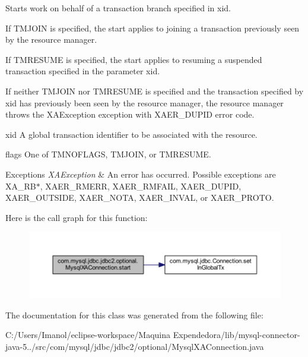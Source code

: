 Starts work on behalf of a transaction branch specified in xid.

If T\+M\+J\+O\+IN is specified, the start applies to joining a transaction previously seen by the resource manager.

If T\+M\+R\+E\+S\+U\+ME is specified, the start applies to resuming a suspended transaction specified in the parameter xid.

If neither T\+M\+J\+O\+IN nor T\+M\+R\+E\+S\+U\+ME is specified and the transaction specified by xid has previously been seen by the resource manager, the resource manager throws the X\+A\+Exception exception with X\+A\+E\+R\+\_\+\+D\+U\+P\+ID error code.

xid A global transaction identifier to be associated with the resource.

flags One of T\+M\+N\+O\+F\+L\+A\+GS, T\+M\+J\+O\+IN, or T\+M\+R\+E\+S\+U\+ME.


\begin{DoxyExceptions}{Exceptions}
{\em X\+A\+Exception} & An error has occurred. Possible exceptions are X\+A\+\_\+\+R\+B$\ast$, X\+A\+E\+R\+\_\+\+R\+M\+E\+RR, X\+A\+E\+R\+\_\+\+R\+M\+F\+A\+IL, X\+A\+E\+R\+\_\+\+D\+U\+P\+ID, X\+A\+E\+R\+\_\+\+O\+U\+T\+S\+I\+DE, X\+A\+E\+R\+\_\+\+N\+O\+TA, X\+A\+E\+R\+\_\+\+I\+N\+V\+AL, or X\+A\+E\+R\+\_\+\+P\+R\+O\+TO. \\
\hline
\end{DoxyExceptions}
Here is the call graph for this function\+:
\nopagebreak
\begin{figure}[H]
\begin{center}
\leavevmode
\includegraphics[width=350pt]{classcom_1_1mysql_1_1jdbc_1_1jdbc2_1_1optional_1_1_mysql_x_a_connection_a7c2af1d5be8d8ba54c6293c6e3e61ffd_cgraph}
\end{center}
\end{figure}


The documentation for this class was generated from the following file\+:\begin{DoxyCompactItemize}
\item 
C\+:/\+Users/\+Imanol/eclipse-\/workspace/\+Maquina Expendedora/lib/mysql-\/connector-\/java-\/5../src/com/mysql/jdbc/jdbc2/optional/Mysql\+X\+A\+Connection.\+java\end{DoxyCompactItemize}
